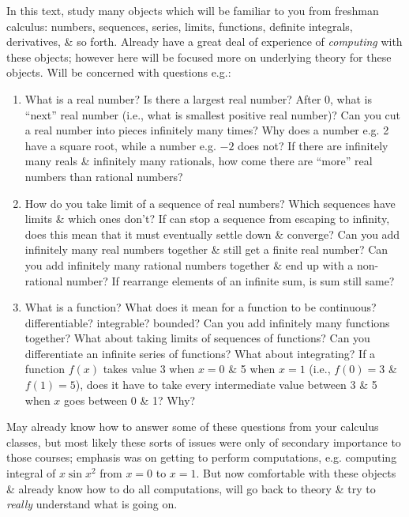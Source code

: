 \documentclass{article}
\begin{document}
\begin{itemize}
\begin{itemize}
		In this text, study many objects which will be familiar to you from freshman calculus: numbers, sequences, series, limits, functions, definite integrals, derivatives, \& so forth. Already have a great deal of experience of {\it computing} with these objects; however here will be focused more on underlying theory for these objects. Will be concerned with questions e.g.:
		\begin{enumerate}
			\item What is a real number? Is there a largest real number? After 0, what is ``next'' real number (i.e., what is smallest positive real number)? Can you cut a real number into pieces infinitely many times? Why does a number e.g. 2 have a square root, while a number e.g. $-2$ does not? If there are infinitely many reals \& infinitely many rationals, how come there are ``more'' real numbers than rational numbers?
			\item How do you take limit of a sequence of real numbers? Which sequences have limits \& which ones don't? If can stop a sequence from escaping to infinity, does this mean that it must eventually settle down \& converge? Can you add infinitely many real numbers together \& still get a finite real number? Can you add infinitely many rational numbers together \& end up with a non-rational number? If rearrange elements of an infinite sum, is sum still same?
			\item What is a function? What does it mean for a function to be continuous? differentiable? integrable? bounded? Can you add infinitely many functions together? What about taking limits of sequences of functions? Can you differentiate an infinite series of functions? What about integrating? If a function $f(x)$ takes value 3 when $x = 0$ \& 5 when $x = 1$ (i.e., $f(0) = 3$ \& $f(1) = 5$), does it have to take every intermediate value between 3 \& 5 when $x$ goes between 0 \& 1? Why?
		\end{enumerate}
		May already know how to answer some of these questions from your calculus classes, but most likely these sorts of issues were only of secondary importance to those courses; emphasis was on getting to perform computations, e.g. computing integral of $x\sin x^2$ from $x = 0$ to $x = 1$. But now comfortable with these objects \& already know how to do all computations, will go back to theory \& try to {\it really} understand what is going on.

\end{itemize}
\end{itemize}
\end{document}
